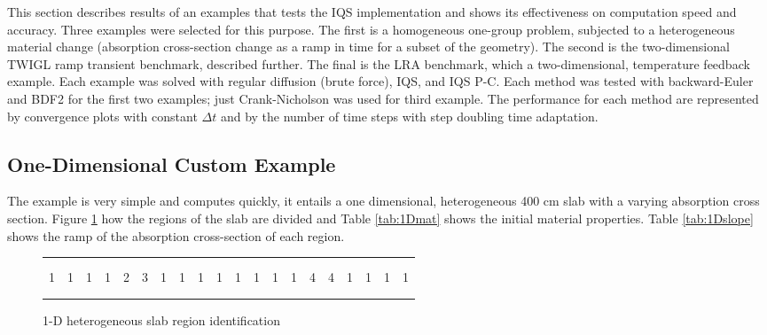 \documentclass[10pt]{scrartcl}
\begin{document}
This section describes results of an examples that tests the IQS implementation and shows its effectiveness on computation speed and accuracy.  Three examples were selected for this purpose.  The first is a homogeneous one-group problem, subjected to a heterogeneous material change (absorption cross-section change as a ramp in time for a subset of the geometry).  The second is the two-dimensional TWIGL ramp transient benchmark, described further.  The final is the LRA benchmark, which a two-dimensional, temperature feedback example.  Each example was solved with regular diffusion (brute force), IQS, and IQS P-C.  Each method was tested with backward-Euler and BDF2 for the first two examples; just Crank-Nicholson was used for third example.  The performance for each method are represented by convergence plots with constant $\Delta t$ and by the number of time steps with step doubling time adaptation.

\subsection{One-Dimensional Custom Example}

The example is very simple and computes quickly, it entails a one dimensional, heterogeneous 400 cm slab with a varying absorption cross section.   Figure \ref{fig:slab} how the regions of the slab are divided and Table \ref{tab:1Dmat} shows the initial material properties.  Table \ref{tab:1Dslope} shows the ramp of the absorption cross-section of each region.

\begin{figure}[!htbp]
\begin{center}
\begin{tabular}{| l | l | l | l | l | l | l | l | l | l | l | l | l | l | l | l | l | l | l | l |}
\hline \hline \hline
  &   &   &   &   &   &    &    &   &   &   &   &   &   &   &   &   &   &   &   \\
  &   &   &   &   &   &    &    &   &   &   &   &   &   &   &   &   &   &   &   \\
1 & 1 & 1 & 1 & 2 & 3 & 1 & 1 & 1 & 1 & 1 & 1 & 1 & 1 & 4 & 4 & 1 & 1 & 1 & 1 \\
  &   &   &   &   &   &    &    &   &   &   &   &   &   &   &   &   &   &   &   \\
  &   &   &   &   &   &    &    &   &   &   &   &   &   &   &   &   &   &   &   \\
\hline \hline \hline
\end{tabular}
\caption{1-D heterogeneous slab region identification}
\label{fig:slab}
\end{center}
\end{figure}
\end{document}
